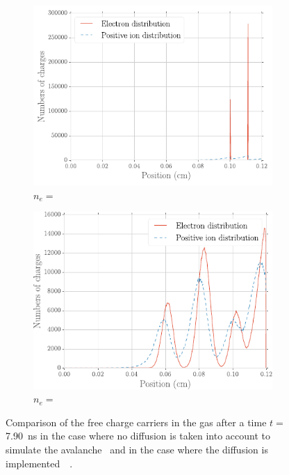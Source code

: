 	\begin{figure}[H]
		\begin{subfigure}{.5\linewidth}
			\centering
			\includegraphics[width = \linewidth]{fig/chapt3/Elec_distrib_no_diff.pdf}
			\caption{\label{fig:Diff-Distrib:A} $n_e =$ }
		\end{subfigure}
		\begin{subfigure}{.5\linewidth}
			\centering
			\includegraphics[width = \linewidth]{fig/chapt3/Elec_distrib_w_diff.pdf}
			\caption{\label{fig:Diff-Distrib:B} $n_e =$ }
		\end{subfigure}
		\caption{\label{fig:Diff-Distrib} Comparison of the free charge carriers in the gas after a time $t =$ \SI{7.90}{ns} in the case where no diffusion is taken into account to simulate the avalanche~ and in the case where the diffusion is implemented~~\cite{VINCENT2017}.}
	\end{figure}
	
